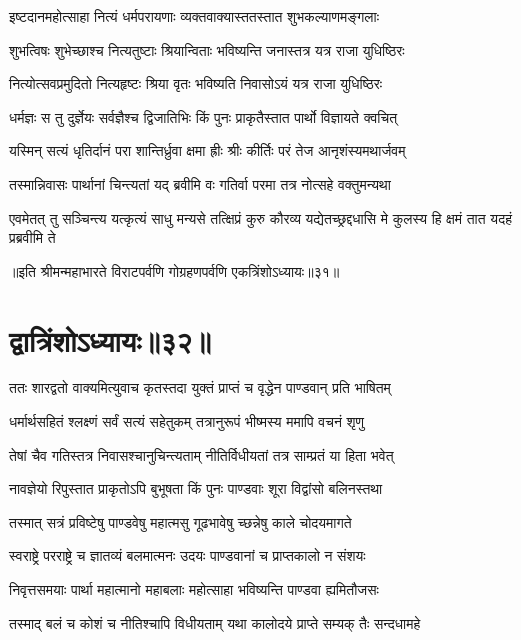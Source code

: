 \twolineshloka
{इष्टदानमहोत्साहा नित्यं धर्मपरायणाः}
{व्यक्तवाक्यास्ततस्तात शुभकल्याणमङ्गलाः}


\twolineshloka
{शुभत्विषः शुभेच्छाश्च नित्यतुष्टाः श्रियान्विताः}
{भविष्यन्ति जनास्तत्र यत्र राजा युधिष्ठिरः}


\twolineshloka
{नित्योत्सवप्रमुदितो नित्यहृष्टः श्रिया वृतः}
{भविष्यति निवासोऽयं यत्र राजा युधिष्ठिरः}


\twolineshloka
{धर्मज्ञः स तु दुर्ज्ञेयः सर्वज्ञैश्च द्विजातिभिः}
{किं पुनः प्राकृतैस्तात पार्थो विज्ञायते क्वचित्}


\twolineshloka
{यस्मिन् सत्यं धृतिर्दानं परा शान्तिर्ध्रुवा क्षमा}
{ह्रीः श्रीः कीर्तिः परं तेज आनृशंस्यमथार्जवम्}


\twolineshloka
{तस्मान्निवासः पार्थानां चिन्त्यतां यद् ब्रवीमि वः}
{गतिर्वा परमा तत्र नोत्सहे वक्तुमन्यथा}


\threelineshloka
{एवमेतत् तु सञ्चिन्त्य यत्कृत्यं साधु मन्यसे}
{तत्क्षिप्रं कुरु कौरव्य यद्येतच्छ्रद्दधासि मे}
{कुलस्य हि क्षमं तात यदहं प्रब्रवीमि ते}

॥इति श्रीमन्महाभारते विराटपर्वणि गोग्रहणपर्वणि एकत्रिंशोऽध्यायः॥३१॥

\chapter{द्वात्रिंशोऽध्यायः॥३२॥}

\twolineshloka
{ततः शारद्वतो वाक्यमित्युवाच कृतस्तदा}
{युक्तं प्राप्तं च वृद्धेन पाण्डवान् प्रति भाषितम्}


\twolineshloka
{धर्मार्थसहितं श्लक्ष्णं सर्वं सत्यं सहेतुकम्}
{तत्रानुरूपं भीष्मस्य ममापि वचनं शृणु}


\twolineshloka
{तेषां चैव गतिस्तत्र निवासश्चानुचिन्त्यताम्}
{नीतिर्विधीयतां तत्र साम्प्रतं या हिता भवेत्}


\twolineshloka
{नावज्ञेयो रिपुस्तात प्राकृतोऽपि बुभूषता}
{किं पुनः पाण्डवाः शूरा विद्वांसो बलिनस्तथा}


\twolineshloka
{तस्मात् सत्रं प्रविष्टेषु पाण्डवेषु महात्मसु}
{गूढभावेषु च्छन्नेषु काले चोदयमागते}


\twolineshloka
{स्वराष्ट्रे परराष्ट्रे च ज्ञातव्यं बलमात्मनः}
{उदयः पाण्डवानां च प्राप्तकालो न संशयः}


\twolineshloka
{निवृत्तसमयाः पार्था महात्मानो महाबलाः}
{महोत्साहा भविष्यन्ति पाण्डवा ह्यमितौजसः}


\twolineshloka
{तस्माद् बलं च कोशं च नीतिश्चापि विधीयताम्}
{यथा कालोदये प्राप्ते सम्यक् तैः सन्दधामहे}


